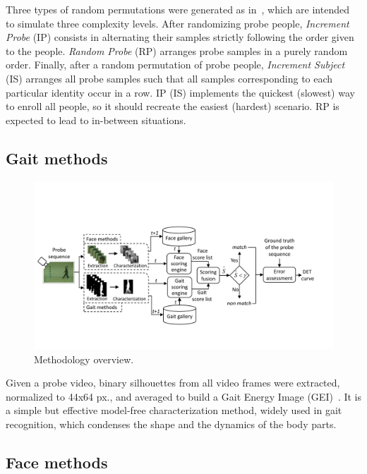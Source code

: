 \documentclass{llncs}
\begin{document}
Three types of random permutations were generated as in~\cite{DeCann:2012}, which are intended to simulate three complexity levels. After randomizing probe people, \emph{Increment Probe} (IP) consists in alternating their samples  strictly following the order given to the people. 
\emph{Random Probe} (RP) arranges probe samples in a purely random order. Finally, after a random permutation of probe people, \emph{Increment Subject} (IS) arranges all probe samples such that all samples corresponding to each particular identity occur in a row. IP (IS) implements the quickest (slowest) way to enroll all people, so it should recreate the easiest (hardest) scenario. RP is expected to lead to in-between situations.

\subsection{Gait methods} 

\begin{figure}[t]
   \centering
   \includegraphics[width=\linewidth]{Figures/scheme.pdf}
   \vspace{-5mm}
   \caption{Methodology overview.}
   \label{fig:scheme}    
   \vspace{-3mm}           
\end{figure}

\vspace{-1mm}
Given a probe video, binary silhouettes from all video frames were extracted, normalized to 44x64 px., and averaged to build a Gait Energy Image (GEI)~\cite{Han2006}. It is a simple but effective model-free characterization method, widely used in gait recognition, which condenses the shape and the dynamics of the body parts.

\subsection{Face methods} 
\end{document}
